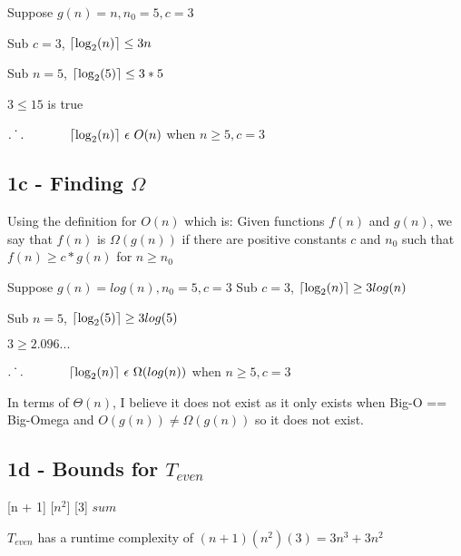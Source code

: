 \documentclass[oneside, a4paper]{article}
\DeclarePairedDelimiter\ceil{\lceil}{\rceil}
\begin{document}
\begin{center}
    Suppose $g(n) = n, n_0 = 5, c = 3$

    Sub $c = 3$, $\ceil{\log_2(n)} \leq 3n$

    Sub $n = 5$, $\ceil{\log_2(5)}  \leq 3*5$

    $3 \leq 15$ is true

    $\dot{.\hspace{.095in}.}\hspace{.5in} \ceil{\log_2(n)} \text{ }\epsilon \text{ } O(n)$ when $n \geq 5, c = 3$
\end{center}

 
\subsection*{1c - Finding $\Omega$}
Using the definition for $O(n)$ which is:
Given functions $f(n)$ and $g(n)$, we say that $f(n)$ is $\Omega(g(n))$ if there are positive constants $c$ and $n_0$ such that $f(n) \geq c * g(n)$ for $n \geq n_0$

\begin{center}
    Suppose $g(n) = log(n), n_0 = 5, c = 3$
    Sub $c = 3$, $\ceil{\log_2(n)} \geq 3log(n)$

    Sub $n = 5$, $\ceil{\log_2(5)} \geq 3log(5)$

    $3 \geq 2.096...$

    $\dot{.\hspace{.095in}.}\hspace{.5in} \ceil{\log_2(n)} \text{  }\epsilon \text{ } \Omega(log(n))$ when $n \geq 5, c = 3$
\end{center}

In terms of $\Theta(n)$, I believe it does not exist as it only exists when Big-O == Big-Omega and $O(g(n)) \neq \Omega(g(n))$ so it does not exist.

\subsection*{1d - Bounds for $T_{even}$}

\begin{algorithmic}
     [n + 1]
         [$n^2$]
             [3]
        \EndFor
    \EndFor
    \State \Return $sum$
    \EndFunction
\end{algorithmic}

$T_{even}$ has a runtime complexity of $(n+1)(n^2)(3) = 3n^3 + 3n^2$
\end{document}
